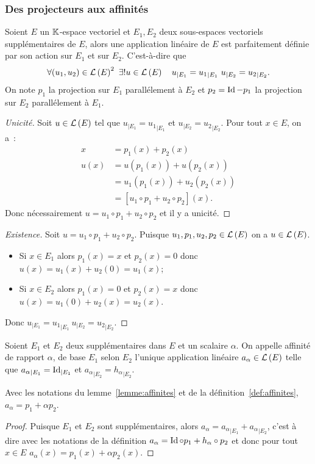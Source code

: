 \subsubsection{Des projecteurs aux affinités}
\begin{lemme}\label{lemme:affinites}
  Soient \(E\) un \(\mathbb{K}\)-espace vectoriel et \(E_1,E_2\) deux sous-espaces vectoriels supplémentaires de \(E\), alors une application linéaire de \(E\) est parfaitement définie par son action sur \(E_1\) et sur \(E_2\). C'est-à-dire que
  \begin{equation}
    \forall (u_1,u_2) \in \Endo{E}^2 \ \exists! u \in \Endo{E} \quad u_{|E_1}={u_1}_{|E_1} \ u_{|E_2}={u_2}_{|E_2}.
  \end{equation}
  On note \(p_1\) la projection sur \(E_1\) parallélement à \(E_2\) et \(p_2=\operatorname{Id}-p_1\) la projection sur \(E_2\) parallélement à \(E_1\).
\end{lemme}
\begin{proof}[Unicité]
  Soit \(u \in \mathcal{L}\left(E\right)\) tel que \(u_{|E_1}={u_1}_{|E_1}\) et  \(u_{|E_2}={u_2}_{|E_2}\). Pour tout \(x \in E\), on a~:
  \begin{align}
    x&=p_1(x)+p_2(x)\\
    u(x)&=u(p_1(x))+u(p_2(x))\\
    &=u_1(p_1(x)) +u_2(p_2(x))\\
    &=[u_1\circ p_1 +u_2 \circ p_2](x).
  \end{align}
  Donc nécessairement \(u=u_1\circ p_1 +u_2 \circ p_2\) et il y a unicité.
\end{proof}
\begin{proof}[Existence]
  Soit \(u=u_1\circ p_1 +u_2 \circ p_2\). Puisque \(u_1,p_1,u_2,p_2 \in \mathcal{L}\left(E\right)\) on a \(u \in \mathcal{L}\left(E\right)\).
  \begin{itemize}
  \item Si \(x \in E_1\) alors \(p_1(x)=x\) et \(p_2(x)=0\) donc \(u(x)=u_1(x)+u_2(0)=u_1(x)\);
  \item Si \(x \in E_2\) alors \(p_1(x)=0\) et \(p_2(x)=x\) donc \(u(x)=u_1(0)+u_2(x)=u_2(x)\).
  \end{itemize}
  Donc \(u_{|E_1}={u_1}_{|E_1} \ u_{|E_2}={u_2}_{|E_2}\).
\end{proof}
%
\begin{defdef}\label{def:affinites}
  Soient \(E_1\) et \(E_2\) deux supplémentaires dans \(E\) et un scalaire \(\alpha\). On appelle affinité de rapport \(\alpha\), de base \(E_1\) selon \(E_2\) l'unique application linéaire \(a_\alpha \in \mathcal{L}\left(E\right)\) telle que \({a_\alpha}_{|E_1} = \operatorname{Id}_{|E_1}\) et \({a_\alpha}_{|E_2} = {h_\alpha}_{|E_2}\).
\end{defdef}
%
\begin{prop}
  Avec les notations du lemme~\ref{lemme:affinites} et de la définition~\ref{def:affinites}, \(a_{\alpha}=p_1+\alpha p_2\).
\end{prop}
\begin{proof}
  Puisque \(E_1\) et \(E_2\) sont supplémentaires, alors \(a_\alpha= {a_\alpha}_{|E_1} + {a_\alpha}_{|E_2}\), c'est à dire avec les notations de la définition \(a_\alpha= \operatorname{Id} \circ p_1 + h_\alpha \circ p_2\) et donc pour tout \(x \in E\) \(a_\alpha(x)=p_1(x)+\alpha p_2(x)\).
\end{proof}

